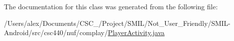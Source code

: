 The documentation for this class was generated from the following file\-:\begin{DoxyCompactItemize}
\item 
/\-Users/alex/\-Documents/\-C\-S\-C\-\_/\-Project/\-S\-M\-I\-L/\-Not\-\_\-\-User\-\_\-\-Friendly/\-S\-M\-I\-L-\/\-Android/src/csc440/nuf/complay/\hyperlink{_player_activity_8java}{Player\-Activity.\-java}\end{DoxyCompactItemize}
